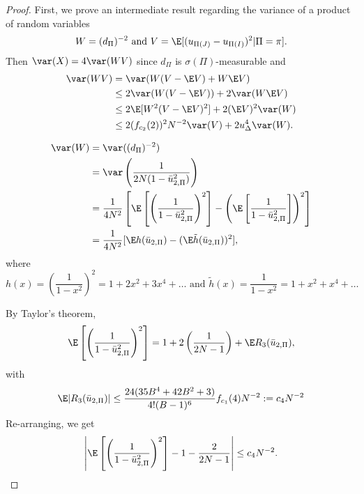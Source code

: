 \begin{proof}
  First, we prove an intermediate result regarding the variance of a product of random variables
  \begin{equation*}
    W = (d_{\Pi})^{-2} \text{ and } V = \E [(u_{\Pi(J)} - u_{\Pi(I)})^2 | \Pi = \pi].
  \end{equation*}
  Then $\var(X) = 4 \var(WV)$ since $d_{\Pi}$ is $\sigma(\Pi)$-measurable and
  \begin{align}
    \label{E:var_prod}
    \var(WV) &= \var(W(V-\E V) + W \E V) \nonumber \\
    &\leq 2\var(W(V-\E V)) + 2 \var (W \E V) \nonumber \\
    &\leq 2 \E [W^2 (V-\E V)^2] + 2(\E V)^2 \var(W) \nonumber \\
    &\leq 2(f_{c_2}(2))^2 N^{-2} \var(V) + 2u_{\Delta}^4 \var(W).
  \end{align}

  \begin{align*}
    \var(W) &= \var ((d_{\Pi})^{-2}) \\
    &= \var \left ( \frac{1}{2N(1-\bar{u}_{2,\Pi}^2)} \right ) \\
    &= \frac{1}{4N^2} \left [ \E \left [ \left (\frac{1}{1-\bar{u}_{2,\Pi}^2}
        \right )^2 \right ] -
      \left ( \E \left [ \frac{1}{1-\bar{u}_{2,\Pi}^2} \right ] \right )^2
    \right ] \\
    &= \frac{1}{4N^2}[\E h(\bar{u}_{2,\Pi}) - (\E \tilde{h}(\bar{u}_{2,\Pi}))^2],
  \end{align*}
  where
  \begin{equation*}
    h(x) = \left ( \frac{1}{1-x^2} \right )^2 = 1 + 2x^2 + 3x^4 + \dots
      \text{ and } \tilde{h}(x) = \frac{1}{1-x^2} = 1 + x^2 + x^4 + \ldots
  \end{equation*}

  By Taylor's theorem,
  \begin{equation*}
    \E \left [ \left (\frac{1}{1-\bar{u}_{2,\Pi}^2} \right )^2 \right ]
    = 1 + 2 \left ( \frac{1}{2N-1} \right ) + \E R_3(\bar{u}_{2,\Pi}),
  \end{equation*}
  with
  \begin{equation*}
    \E |R_3(\bar{u}_{2,\Pi})| \leq \frac{24(35B^4 + 42 B^2 + 3)}{4!(B-1)^6}f_{c_1}(4) N^{-2}
    := c_4 N^{-2}
  \end{equation*}
  Re-arranging, we get
  \begin{equation*}
    \left | \E \left [ \left (\frac{1}{1-\bar{u}_{2,\Pi}^2} \right )^2 \right ]
      - 1 - \frac{2}{2N-1} \right | \leq c_4 N^{-2}.
  \end{equation*}


\end{proof}
